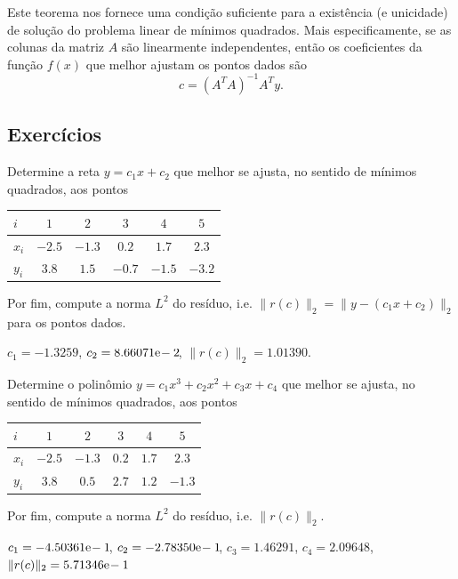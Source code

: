 Este teorema nos fornece uma condição suficiente para a existência (e unicidade) de solução do problema linear de mínimos quadrados. Mais especificamente, se as colunas da matriz $A$ são linearmente independentes, então os coeficientes da função $f(x)$ que melhor ajustam os pontos dados são
\begin{equation}
  c = (A^TA)^{-1}A^Ty.
\end{equation}

\subsection{Exercícios}

\begin{exer}
  Determine a reta $y = c_1x + c_2$ que melhor se ajusta, no sentido de mínimos quadrados, aos pontos
  \begin{center}
    \begin{tabular}{l|ccccc}
      $i$ & $1$ & $2$ & $3$ & $4$ & $5$ \\\hline
      $x_i$ & $-2.5$ & $-1.3$ & $0.2$ & $1.7$ & $2.3$\\
      $y_i$ & $3.8$ & $1.5$ & $-0.7$ & $-1.5$ & $-3.2$\\\hline
    \end{tabular}
  \end{center}
Por fim, compute a norma $L^2$ do resíduo, i.e. $\|r(c)\|_2 = \|y - (c_1x + c_2)\|_2$ para os pontos dados.
\end{exer}
\begin{resp}
  $c_1 = -1.3259$, $c_2 = 8.66071\mathrm{e}\!-2\!$, $\|r(c)\|_2 = 1.01390$.
\end{resp}

\begin{exer}
  Determine o polinômio $y = c_1x^3 + c_2x^2 + c_3x + c_4$ que melhor se ajusta, no sentido de mínimos quadrados, aos pontos
  \begin{center}
    \begin{tabular}{l|ccccc}
      $i$ & $1$ & $2$ & $3$ & $4$ & $5$ \\\hline
      $x_i$ & $-2.5$ & $-1.3$ & $0.2$ & $1.7$ & $2.3$\\
      $y_i$ & $3.8$ & $0.5$ & $2.7$ & $1.2$ & $-1.3$\\\hline
    \end{tabular}
  \end{center}
Por fim, compute a norma $L^2$ do resíduo, i.e. $\|r(c)\|_2$.
\end{exer}
\begin{resp}
  $c_1 = -4.50361\mathrm{e}\!-1\!$, $c_2 = -2.78350\mathrm{e}\!-1\!$, $c_3 = 1.46291$, $c_4 = 2.09648$, $\|r(c)\|_2 = 5.71346\mathrm{e}\!-1\!$
\end{resp}

